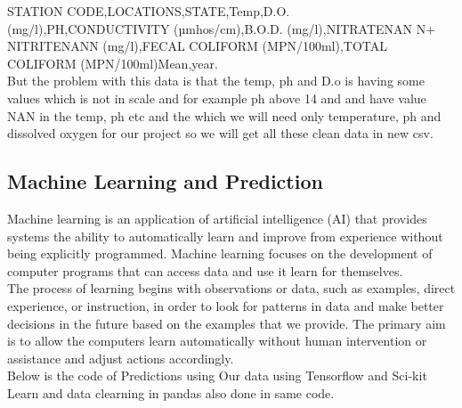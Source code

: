 STATION CODE,LOCATIONS,STATE,Temp,D.O. (mg/l),PH,CONDUCTIVITY (µmhos/cm),B.O.D. (mg/l),NITRATENAN N+ NITRITENANN (mg/l),FECAL COLIFORM (MPN/100ml),TOTAL COLIFORM (MPN/100ml)Mean,year.\\


But the problem with this data is that the temp, ph and D.o is having some values which is not in scale and for example ph above 14 and and have value NAN in the temp, ph etc and the which we will need only temperature, ph and dissolved oxygen for our project so we will get all these clean data in new csv.

\subsection{Machine Learning and Prediction}

Machine learning is an application of artificial intelligence (AI) that provides systems the ability to automatically learn and improve from experience without being explicitly programmed. Machine learning focuses on the development of computer programs that can access data and use it learn for themselves.\\


The process of learning begins with observations or data, such as examples, direct experience, or instruction, in order to look for patterns in data and make better decisions in the future based on the examples that we provide. The primary aim is to allow the computers learn automatically without human intervention or assistance and adjust actions accordingly.\\

Below is the code of Predictions using Our data using Tensorflow and Sci-kit Learn and data clearning in pandas also done in same code.\\

